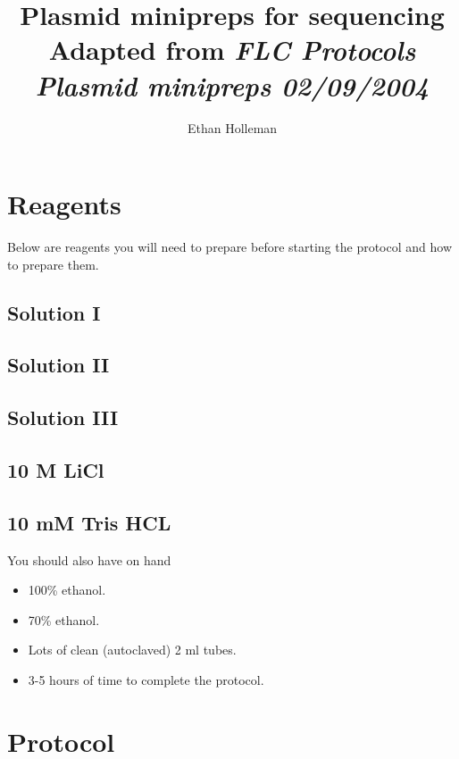\documentclass[12pt]{article}
\theoremstyle{definition}
\begin{document}
\title{
	\textbf{Plasmid minipreps for sequencing}\\
	\large Adapted from \emph{FLC Protocols Plasmid minipreps 02/09/2004}}

\author{Ethan Holleman}
\maketitle

\section*{Reagents}

Below are reagents you will need to prepare before starting the protocol and how to prepare them.

\subsection*{Solution I}
\label{sec:sol-1}

\subsection*{Solution II}
\label{sec:sol-2}

\subsection*{Solution III}
\label{sec:sol-3}

\subsection*{10 M LiCl}
\label{sec:licl}

\subsection*{10 mM Tris HCL}
\label{sec:tris}

You should also have on hand

\begin{itemize}
	\item 100\% ethanol.
	\item 70\% ethanol.
	\item Lots of clean (autoclaved) 2 ml tubes.
	\item 3-5 hours of time to complete the protocol.
\end{itemize}

\section*{Protocol}
\end{document}
